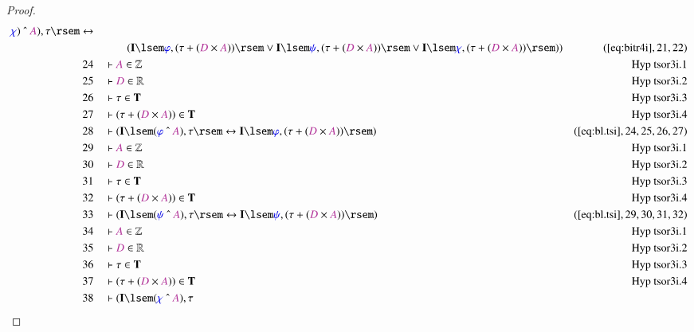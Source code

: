 \begin{proof}
\begin{align}
      \mw{\chi} ) ~\string^~ \mc{A} ) , \tau \rsem
      \leftrightarrow  \notag \\ & & & \qquad
     ( \mathbf{I} \lsem \mw{\varphi} , (
      \tau + ( \mc{D} \times \mc{A} ) ) \rsem \vee
      \mathbf{I} \lsem \mw{\psi} , ( \tau + ( \mc{D} \times
      \mc{A} ) ) \rsem \vee \mathbf{I} \lsem \mw{\chi} , (
      \tau + ( \mc{D} \times \mc{A} ) ) \rsem )
      )&(\mbox{\ref{eq:bitr4i}},21,22)\notag
  \\ 24 &&  & \vdash \mc{A} \in
      \mathbb{Z}&\text{Hyp~tsor3i.1}\notag%
  \\ 25 &&  & \vdash \mc{D} \in
      \mathbb{R}&\text{Hyp~tsor3i.2}\notag%
  \\ 26 &&  & \vdash \tau \in \mathbf{T}&\text{Hyp~tsor3i.3}\notag%
  \\ 27 &&  & \vdash ( \tau + ( \mc{D} \times \mc{A} ) ) \in
      \mathbf{T}&\text{Hyp~tsor3i.4}\notag%
  \\ 28 &&  & \vdash ( \mathbf{I} \lsem ( \mw{\varphi} ~\string^~ \mc{A} ) ,
      \tau \rsem \leftrightarrow \mathbf{I} \lsem
      \mw{\varphi} , ( \tau + ( \mc{D} \times \mc{A} ) )
      \rsem )&(\mbox{\ref{eq:bl.tsi}},24,25,26,27)\notag
  \\ 29 &&  & \vdash \mc{A} \in
      \mathbb{Z}&\text{Hyp~tsor3i.1}\notag%
  \\ 30 &&  & \vdash \mc{D} \in
      \mathbb{R}&\text{Hyp~tsor3i.2}\notag%
  \\ 31 &&  & \vdash \tau \in \mathbf{T}&\text{Hyp~tsor3i.3}\notag%
  \\ 32 &&  & \vdash ( \tau + ( \mc{D} \times \mc{A} ) ) \in
      \mathbf{T}&\text{Hyp~tsor3i.4}\notag%
  \\ 33 &&  & \vdash ( \mathbf{I} \lsem ( \mw{\psi} ~\string^~ \mc{A} ) , \tau
      \rsem \leftrightarrow \mathbf{I} \lsem \mw{\psi} , (
      \tau + ( \mc{D} \times \mc{A} ) ) \rsem
      )&(\mbox{\ref{eq:bl.tsi}},29,30,31,32)\notag
  \\ 34 &&  & \vdash \mc{A} \in
      \mathbb{Z}&\text{Hyp~tsor3i.1}\notag%
  \\ 35 &&  & \vdash \mc{D} \in
      \mathbb{R}&\text{Hyp~tsor3i.2}\notag%
  \\ 36 &&  & \vdash \tau \in \mathbf{T}&\text{Hyp~tsor3i.3}\notag%
  \\ 37 &&  & \vdash ( \tau + ( \mc{D} \times \mc{A} ) ) \in
      \mathbf{T}&\text{Hyp~tsor3i.4}\notag%
  \\ 38 &&  & \vdash ( \mathbf{I} \lsem ( \mw{\chi} ~\string^~ \mc{A} ) , \tau

\end{align}
\end{proof}
